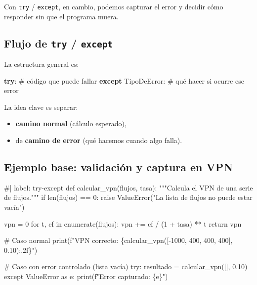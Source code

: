 \documentclass[
  spanish,
  letterpaper,
  DIV=11,
  numbers=noendperiod]{scrreprt}
\newenvironment{Shaded}{\begin{snugshade}}{\end{snugshade}}
\newcommand{\CommentTok}[1]{\textcolor[rgb]{0.37,0.37,0.37}{#1}}
\newcommand{\ControlFlowTok}[1]{\textcolor[rgb]{0.00,0.23,0.31}{\textbf{#1}}}
\newcommand{\NormalTok}[1]{\textcolor[rgb]{0.00,0.23,0.31}{#1}}
\providecommand{\tightlist}{%
  \setlength{\itemsep}{0pt}\setlength{\parskip}{0pt}}
\begin{document}
Con \texttt{try} / \texttt{except}, en cambio, podemos capturar el error
y decidir cómo responder sin que el programa muera.

\subsection{\texorpdfstring{Flujo de \texttt{try} /
\texttt{except}}{Flujo de try / except}}\label{flujo-de-try-except}

La estructura general es:

\begin{Shaded}
\begin{Highlighting}[]
\ControlFlowTok{try}\NormalTok{:}
    \CommentTok{\# código que puede fallar}
\ControlFlowTok{except}\NormalTok{ TipoDeError:}
    \CommentTok{\# qué hacer si ocurre ese error}
\end{Highlighting}
\end{Shaded}

La idea clave es separar:

\begin{itemize}
\tightlist
\item
  \textbf{camino normal} (cálculo esperado),
\item
  de \textbf{camino de error} (qué hacemos cuando algo falla).
\end{itemize}

\subsection{Ejemplo base: validación y captura en
VPN}\label{ejemplo-base-validaciuxf3n-y-captura-en-vpn}

\begin{Shaded}
\begin{Highlighting}[]
\NormalTok{\#| label: try{-}except}
\NormalTok{def calcular\_vpn(flujos, tasa):}
\NormalTok{    """Calcula el VPN de una serie de flujos."""}
\NormalTok{    if len(flujos) == 0:}
\NormalTok{        raise ValueError("La lista de flujos no puede estar vacía")}

\NormalTok{    vpn = 0}
\NormalTok{    for t, cf in enumerate(flujos):}
\NormalTok{        vpn += cf / (1 + tasa) ** t}
\NormalTok{    return vpn}

\NormalTok{\# Caso normal}
\NormalTok{print(f"VPN correcto: \{calcular\_vpn([{-}1000, 400, 400, 400], 0.10):.2f\}")}

\NormalTok{\# Caso con error controlado (lista vacía)}
\NormalTok{try:}
\NormalTok{    resultado = calcular\_vpn([], 0.10)}
\NormalTok{except ValueError as e:}
\NormalTok{    print(f"Error capturado: \{e\}")}
\end{Highlighting}
\end{Shaded}
\end{document}
